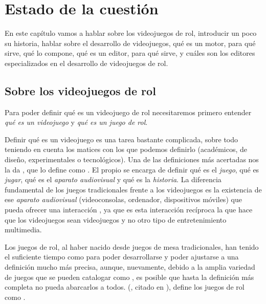 \chapter{Estado de la cuestión}
\label{cap:estadoDeLaCuestion}

\begin{resumen}
En este capítulo vamos a hablar sobre los videojuegos de rol, introducir un poco su historia, hablar sobre el desarrollo de videojuegos, qué es un motor, para qué sirve, qué lo compone, qué es un editor, para qué sirve, y cuáles son los editores especializados en el desarrollo de videojuegos de rol.
\end{resumen}

\section{Sobre los videojuegos de rol}
Para poder definir qué es un videojuego de rol necesitaremos primero entender \textit{qué es un videojuego} y \textit{qué es un juego de rol}.

\medskip

Definir qué es un videojuego es una tarea bastante complicada, sobre todo teniendo en cuenta los matices con los que podemos definirlo (académicos, de diseño, experimentales o tecnológicos). Una de las definiciones más acertadas nos la da \cite{EspositoVJ}, que lo define como . El propio \citeauthor{EspositoVJ} se encarga de definir qué es el \textit{juego}, qué es \textit{jugar}, qué es el \textit{aparato audiovisual} y qué es la \textit{historia}. La diferencia fundamental de los juegos tradicionales frente a los videojuegos es la existencia de ese \textit{aparato audiovisual} (videoconsolas, ordenador, dispositivos móviles) que pueda ofrecer una interacción , ya que es esta interacción recíproca la que hace que los videojuegos sean videojuegos y no otro tipo de entretenimiento multimedia.

\medskip

Los juegos de rol, al haber nacido desde juegos de mesa tradicionales, han tenido el suficiente tiempo como para poder desarrollarse y poder ajustarse a una definición mucho más precisa, aunque, nuevamente, debido a la amplia variedad de juegos que se pueden catalogar como , es posible que hasta la definición más completa no pueda abarcarlos a todos. \citeauthor{LortzRPG} (\citeyear{LortzRPG}, citado en \cite{FineRPG}), define los juegos de rol como .

